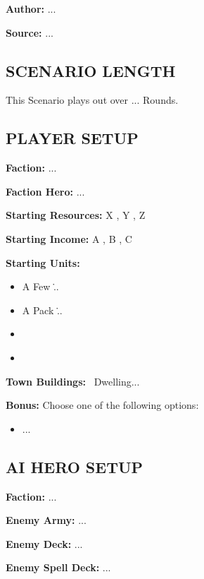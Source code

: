 
\begin{multicols*}{2}

\textbf{Author:} ...

\textbf{Source:} ...

\subsection*{\MakeUppercase{Scenario Length}}

This Scenario plays out over ... Rounds.

\subsection*{\MakeUppercase{Player Setup}}

\textbf{Faction:} ...

\textbf{Faction Hero:} ...

\textbf{Starting Resources:} X , Y , Z 

\textbf{Starting Income:} A , B , C 

\textbf{Starting Units:}
\begin{itemize}
  \item A Few \bronze\...
  \item A Pack \silver\...
  \item \golden\
  \item {}
\end{itemize}

\textbf{Town Buildings:} \bronze\ Dwelling...

\textbf{Bonus:} Choose one of the following options:
\begin{itemize}
    \item ...
\end{itemize}

\subsection*{\MakeUppercase{AI Hero Setup}}

\textbf{Faction:} ...

\textbf{Enemy Army:} ...

\textbf{Enemy Deck:} ...

\textbf{Enemy Spell Deck:} ...


\end{multicols*}
